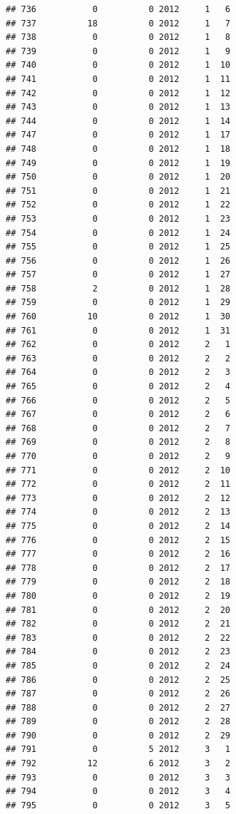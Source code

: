 \documentclass[
]{article}
\begin{document}
\begin{verbatim}
## 736           0          0 2012     1   6
## 737          18          0 2012     1   7
## 738           0          0 2012     1   8
## 739           0          0 2012     1   9
## 740           0          0 2012     1  10
## 741           0          0 2012     1  11
## 742           0          0 2012     1  12
## 743           0          0 2012     1  13
## 744           0          0 2012     1  14
## 747           0          0 2012     1  17
## 748           0          0 2012     1  18
## 749           0          0 2012     1  19
## 750           0          0 2012     1  20
## 751           0          0 2012     1  21
## 752           0          0 2012     1  22
## 753           0          0 2012     1  23
## 754           0          0 2012     1  24
## 755           0          0 2012     1  25
## 756           0          0 2012     1  26
## 757           0          0 2012     1  27
## 758           2          0 2012     1  28
## 759           0          0 2012     1  29
## 760          10          0 2012     1  30
## 761           0          0 2012     1  31
## 762           0          0 2012     2   1
## 763           0          0 2012     2   2
## 764           0          0 2012     2   3
## 765           0          0 2012     2   4
## 766           0          0 2012     2   5
## 767           0          0 2012     2   6
## 768           0          0 2012     2   7
## 769           0          0 2012     2   8
## 770           0          0 2012     2   9
## 771           0          0 2012     2  10
## 772           0          0 2012     2  11
## 773           0          0 2012     2  12
## 774           0          0 2012     2  13
## 775           0          0 2012     2  14
## 776           0          0 2012     2  15
## 777           0          0 2012     2  16
## 778           0          0 2012     2  17
## 779           0          0 2012     2  18
## 780           0          0 2012     2  19
## 781           0          0 2012     2  20
## 782           0          0 2012     2  21
## 783           0          0 2012     2  22
## 784           0          0 2012     2  23
## 785           0          0 2012     2  24
## 786           0          0 2012     2  25
## 787           0          0 2012     2  26
## 788           0          0 2012     2  27
## 789           0          0 2012     2  28
## 790           0          0 2012     2  29
## 791           0          5 2012     3   1
## 792          12          6 2012     3   2
## 793           0          0 2012     3   3
## 794           0          0 2012     3   4
## 795           0          0 2012     3   5

\end{verbatim}
\end{document}
